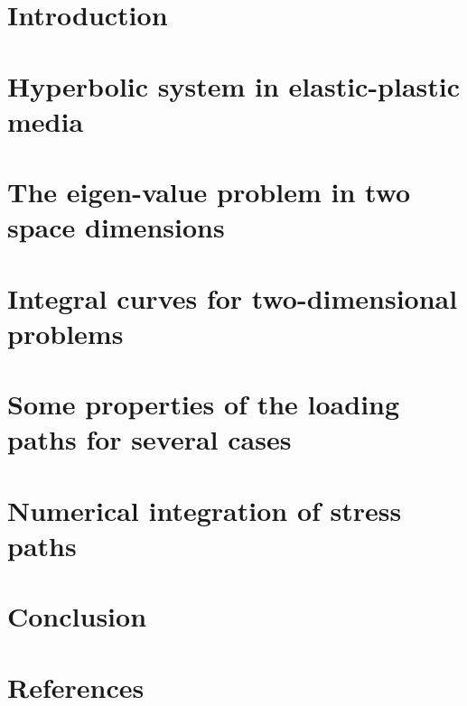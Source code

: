 \documentclass[final,3p,times]{elsarticle}
\begin{document}
\section{Introduction}
\label{sec:introduction}



\section{Hyperbolic system in elastic-plastic media}
\label{sec:charac_plast}


\section{The eigen-value problem in two space dimensions}
\label{sec:2dproblem}


\section{Integral curves for two-dimensional problems}
\label{sec:integral_curves}



\section{Some properties of the loading paths for several cases}
\label{sec:stress_paths}


\section{Numerical integration of stress paths}
\label{sec:numerical_results}



\section{Conclusion}
\label{sec:conclusion}



\section*{References}


\end{document}
